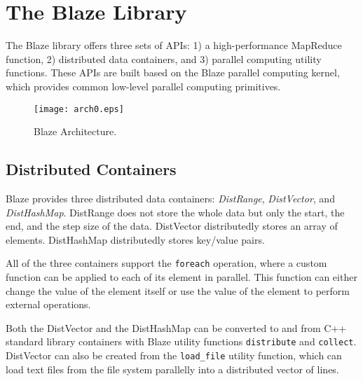 \section{The Blaze Library}
\label{sec:blaze}
The Blaze library offers three sets of APIs: 1) a high-performance MapReduce function, 2) distributed data containers, and 3) parallel computing utility functions.
These APIs are built based on the Blaze parallel computing kernel, which provides common low-level parallel computing primitives.



\begin{figure}
  \begin{center}
  \texttt{[image: arch0.eps]}
  \end{center}
  \vspace{-0.2cm}
  \caption{Blaze Architecture.
  }
  \label{fig:mrdiff}
\end{figure}

\subsection{Distributed Containers}

Blaze provides three distributed data containers: \emph{DistRange}, \emph{DistVector}, and \emph{DistHashMap}.
DistRange does not store the whole data but only the start, the end, and the step size of the data.
DistVector distributedly stores an array of elements.
DistHashMap distributedly stores key/value pairs.

All of the three containers support the \lstinline{foreach} operation, where a custom function can be applied to each of its element in parallel.
This function can either change the value of the element itself or use the value of the element to perform external operations.

Both the DistVector and the DistHashMap can be converted to and from C++ standard library containers with Blaze utility functions \lstinline{distribute} and \lstinline{collect}.
DistVector can also be created from the \lstinline{load_file} utility function, which can load text files from the file system parallelly into a distributed vector of lines.

